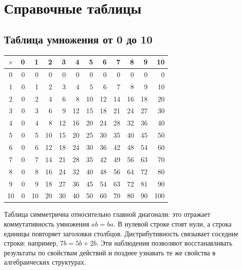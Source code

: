 \chapter*{Справочные таблицы}

\section*{Таблица умножения от 0 до 10}

\begingroup\small\renewcommand{\arraystretch}{1.4}\setlength{\tabcolsep}{5pt}

\begin{center}\begin{tabular}{|c|r|r|r|r|r|r|r|r|r|r|r|}\hline

\(\times\)&0&1&2&3&4&5&6&7&8&9&10\\\hline

0&0&0&0&0&0&0&0&0&0&0&0\\\hline

1&0&1&2&3&4&5&6&7&8&9&10\\\hline

2&0&2&4&6&8&10&12&14&16&18&20\\\hline

3&0&3&6&9&12&15&18&21&24&27&30\\\hline

4&0&4&8&12&16&20&24&28&32&36&40\\\hline

5&0&5&10&15&20&25&30&35&40&45&50\\\hline

6&0&6&12&18&24&30&36&42&48&54&60\\\hline

7&0&7&14&21&28&35&42&49&56&63&70\\\hline

8&0&8&16&24&32&40&48&56&64&72&80\\\hline

9&0&9&18&27&36&45&54&63&72&81&90\\\hline

10&0&10&20&30&40&50&60&70&80&90&100\\\hline

\end{tabular}\end{center}\endgroup

Таблица симметрична относительно главной диагонали: это отражает коммутативность умножения \(ab=ba\). В нулевой строке стоят нули, а строка единицы повторяет заголовки столбцов. Дистрибутивность связывает соседние строки: например, \(7b=5b+2b\). Эти наблюдения позволяют восстанавливать результаты по свойствам действий и позднее узнавать те же свойства в алгебраических структурах.

